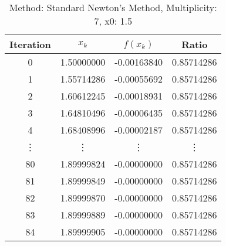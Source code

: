 \begin{table}
\centering
\caption{Method: Standard Newton's Method, Multiplicity: 7, x0: 1.5}
\label{tab:table_Standard_Newton's_Method_7_1_5}
\begin{tabular}{c c c c}
\toprule
Iteration &      $x_k$ &    $f(x_k)$ &      Ratio \\
\midrule
        0 & 1.50000000 & -0.00163840 & 0.85714286 \\
        1 & 1.55714286 & -0.00055692 & 0.85714286 \\
        2 & 1.60612245 & -0.00018931 & 0.85714286 \\
        3 & 1.64810496 & -0.00006435 & 0.85714286 \\
        4 & 1.68408996 & -0.00002187 & 0.85714286 \\
   \vdots &     \vdots &      \vdots &     \vdots \\
       80 & 1.89999824 & -0.00000000 & 0.85714286 \\
       81 & 1.89999849 & -0.00000000 & 0.85714286 \\
       82 & 1.89999870 & -0.00000000 & 0.85714286 \\
       83 & 1.89999889 & -0.00000000 & 0.85714286 \\
       84 & 1.89999905 & -0.00000000 & 0.85714286 \\
\bottomrule
\end{tabular}
\end{table}
